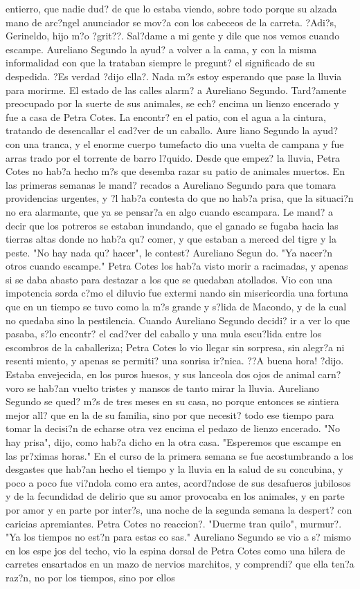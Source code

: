  entierro, que nadie dud? de que lo estaba viendo, sobre todo porque su alzada mano de arc?ngel anunciador se mov?a con los cabeceos de la carreta. ?Adi?s, Gerineldo, hijo m?o ?grit??. Sal?dame a mi gente y dile que nos vemos cuando escampe. Aureliano Segundo la ayud? a volver a la cama, y con la misma informalidad con que la trataban siempre le pregunt? el significado de su despedida. ?Es verdad ?dijo ella?. Nada m?s estoy esperando que pase la lluvia para morirme. El estado de las calles alarm? a Aureliano Segundo. Tard?amente preocupado por la suerte de sus animales, se ech? encima un lienzo encerado y fue a casa de Petra Cotes. La encontr? en el patio, con el agua a la cintura, tratando de desencallar el cad?ver de un caballo. Aure liano Segundo la ayud? con una tranca, y el enorme cuerpo tumefacto dio una vuelta de campana y fue arras trado por el torrente de barro l?quido. Desde que empez? la lluvia, Petra Cotes no hab?a hecho m?s que desemba razar su patio de animales muertos. En las primeras semanas le mand? recados a Aureliano Segundo para que tomara providencias urgentes, y ?l hab?a contesta do que no hab?a prisa, que la situaci?n no era alarmante, que ya se pensar?a en algo cuando escampara. Le mand? a decir que los potreros se estaban inundando, que el ganado se fugaba hacia las tierras altas donde no hab?a qu? comer, y que estaban a merced del tigre y la peste. "No hay nada qu? hacer", le contest? Aureliano Segun do. "Ya nacer?n otros cuando escampe." Petra Cotes los hab?a visto morir a racimadas, y apenas si se daba abasto para destazar a los que se quedaban atollados. Vio con una impotencia sorda c?mo el diluvio fue extermi nando sin misericordia una fortuna que en un tiempo se tuvo como la m?s grande y s?lida de Macondo, y de la cual no quedaba sino la pestilencia. Cuando Aureliano Segundo decidi? ir a ver lo que pasaba, s?lo encontr? el cad?ver del caballo y una mula escu?lida entre los escombros de la caballeriza; Petra Cotes lo vio llegar sin sorpresa, sin alegr?a ni resenti miento, y apenas se permiti? una sonrisa ir?nica. ??A buena hora! ?dijo. Estaba envejecida, en los puros huesos, y sus lanceola dos ojos de animal carn?voro se hab?an vuelto tristes y mansos de tanto mirar la lluvia. Aureliano Segundo se qued? m?s de tres meses en su casa, no porque entonces se sintiera mejor all? que en la de su familia, sino por que necesit? todo ese tiempo para tomar la decisi?n de echarse otra vez encima el pedazo de lienzo encerado. "No hay prisa", dijo, como hab?a dicho en la otra casa. "Esperemos que escampe en las pr?ximas horas." En el curso de la primera semana se fue acostumbrando a los desgastes que hab?an hecho el tiempo y la lluvia en la salud de su concubina, y poco a poco fue vi?ndola como era antes, acord?ndose de sus desafueros jubilosos y de la fecundidad de delirio que su amor provocaba en los animales, y en parte por amor y en parte por inter?s, una noche de la segunda semana la despert? con caricias apremiantes. Petra Cotes no reaccion?. "Duerme tran quilo", murmur?. "Ya los tiempos no est?n para estas co sas." Aureliano Segundo se vio a s? mismo en los espe jos del techo, vio la espina dorsal de Petra Cotes como una hilera de carretes ensartados en un mazo de nervios marchitos, y comprendi? que ella ten?a raz?n, no por los tiempos, sino por ellos 